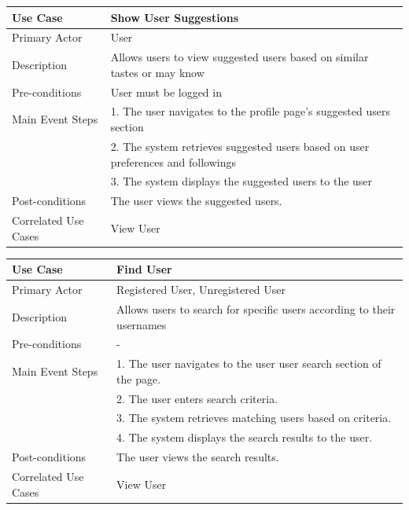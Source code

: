 \begin{longtable}{|p{}|p{}|}
    \hline
    \rowcolor{lightblue}
    \textbf{Use Case} & \textbf{Show User Suggestions} \\
    \hline
    Primary Actor &User \\
    \hline
    Description &Allows users to view suggested users based on similar tastes or may know\\
    \hline
    Pre-conditions & User must be logged in\\
    \hline
    Main Event Steps &1. The user navigates to the profile page's suggested users section\\
    &2. The system retrieves suggested users based on user preferences and followings\\
    &3. The system displays the suggested users to the user\\
    \hline
    Post-conditions & The user views the suggested users.\\
    \hline
    Correlated Use Cases & View User\\
    \hline
\end{longtable}


\begin{longtable}{|p{}|p{}|}
    \hline
    \rowcolor{lightblue}
    \textbf{Use Case} & \textbf{Find User} \\
    \hline
    Primary Actor & Registered User, Unregistered User\\
    \hline
    Description & Allows users to search for specific users according to their usernames\\
    \hline
    Pre-conditions &- \\
    \hline
    Main Event Steps & 1. The user navigates to the user user search section of the page. \\
    & 2. The user enters search criteria. \\
    & 3. The system retrieves matching users based on criteria. \\
    & 4. The system displays the search results to the user. \\
    \hline
    Post-conditions & The user views the search results. \\
    \hline
    Correlated Use Cases & View User\\
    \hline
\end{longtable}

